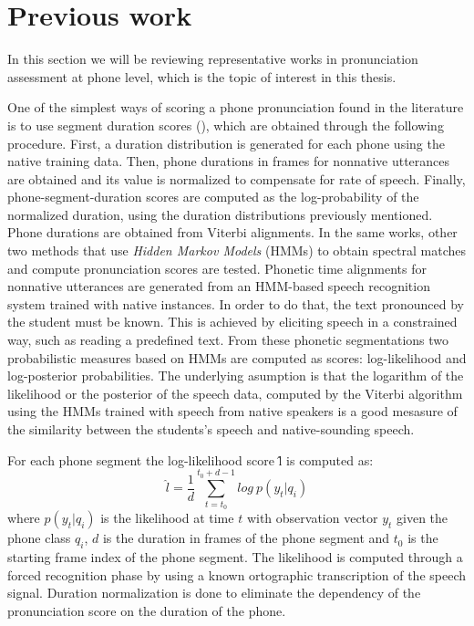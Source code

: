 \section{Previous work} \label{section:prev_work}

In this section we will be reviewing representative works in pronunciation assessment
at phone level, which is the topic of interest in this thesis.

One of the simplest ways of scoring a phone pronunciation found in the literature
is to use segment duration scores (\cite{pronunciation_scoring_instruction, pronunciation_scoring_phone_segments_instruction}), which are obtained through the following
procedure. First, a duration distribution is generated for each phone
using the native training data.
Then, phone durations in frames for nonnative utterances are obtained
and its value is normalized to compensate for rate of speech.
Finally, phone-segment-duration scores are computed as
the log-probability of the normalized duration, using the duration
distributions previously mentioned. Phone durations are obtained from Viterbi alignments.
In the same works, other two methods that use \textit{Hidden Markov Models} (HMMs) to obtain
spectral matches and compute pronunciation scores are tested.
Phonetic time alignments for
nonnative utterances are generated from an HMM-based speech recognition system trained
with native instances. In order to do that, the text pronounced by the student
must be known. This is achieved by eliciting speech in a
constrained way, such as reading a predefined text.
From these phonetic segmentations two
probabilistic measures based on HMMs are computed as scores: log-likelihood and
log-posterior probabilities. The underlying asumption is that the logarithm of the likelihood
or the posterior of the speech data, computed by the Viterbi
algorithm using the HMMs trained with speech from native
speakers is a good mesasure of the similarity between the students's
speech and native-sounding speech.

For each phone segment the log-likelihood score \^{l} is computed as:
\begin{equation}
\label{eq:logLikelihood}
\hat{l} = \frac{1}{d} \sum_{t=t_{0}}^{t_{0}+d-1} log \ p(y_{t}|q_{i})
\end{equation}
where $p(y_{t}|q_{i})$ is the likelihood at time $t$ with observation vector $y_{t}$
given the phone class $q_{i}$, $d$ is the duration in frames of the phone segment
and $t_{0}$ is the starting frame index of the phone segment.
The likelihood is computed through a forced recognition phase by using a known ortographic
transcription of the speech signal. Duration normalization is done to
eliminate the dependency of the pronunciation score on the duration of the phone.

